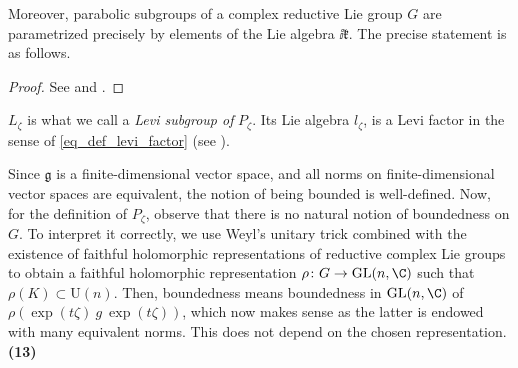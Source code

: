 
Moreover, parabolic subgroups of a complex reductive Lie group \(G\) are parametrized precisely by elements of the Lie algebra \(\ii\mathfrak{k}\). The precise statement is as follows.

\begin{proof}
    See \parencite[Lemma 2.5]{garcia2009hitchin} and \parencite[Lemma 2.12]{trautwein2015surveygitpictureyangmills}.
\end{proof}

\(L_\zeta\) is what we call a \textit{Levi subgroup of} \(P_\zeta\). Its Lie algebra \(l_\zeta\), is a Levi factor in the sense of \eqref{eq_def_levi_factor} (see \parencite[Lemma 2.14]{trautwein2015surveygitpictureyangmills}). 

\begin{obs}
    {\color{violet}
    Since \(\mathfrak{g}\) is a finite-dimensional vector space, and all norms on finite-dimensional vector spaces are equivalent, the notion of being bounded is well-defined. Now, for the definition of \(P_\zeta\), observe that there is no natural notion of boundedness on \(G\). To interpret it correctly, we use Weyl's unitary trick \parencite[Th. 15.2.10]{hilgert2011structure} combined with the existence of faithful holomorphic representations of reductive complex Lie groups \parencite[Th. 15.3.11]{hilgert2011structure} to obtain a faithful holomorphic representation \(\rho\colon G \to \mathrm{GL}(n, \C)\) such that \(\rho(K)\subset \mathrm{U}(n)\). Then, boundedness means boundedness in \(\mathrm{GL}(n, \C)\) of \(\rho(\exp(t \zeta)\ g \ \exp(t\zeta))\), which now makes sense as the latter is endowed with many equivalent norms. This does not depend on the chosen representation. \textbf{(13)} 
    }
\end{obs}

